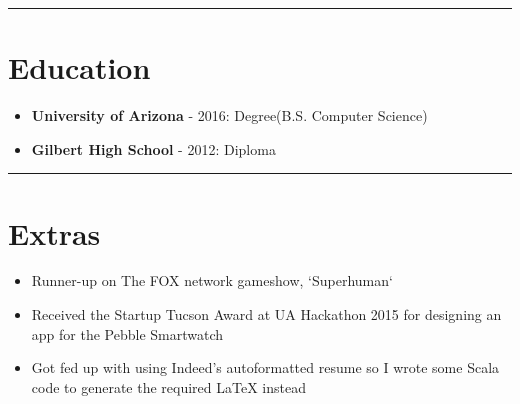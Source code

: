 \documentclass{article}
\begin{document}
\noindent\rule{\linewidth}{1pt}

\section*{Education}

\begin{itemize}\item \textbf{University of Arizona} - 2016: Degree(B.S. Computer Science)
\item \textbf{Gilbert High School} - 2012: Diploma\end{itemize}

\noindent\rule{\linewidth}{1pt}

\section*{Extras}

\begin{itemize}\item Runner-up on The FOX network gameshow, `Superhuman`
\item Received the Startup Tucson Award at UA Hackathon 2015 for designing an app for the Pebble Smartwatch
\item Got fed up with using Indeed's autoformatted resume so I wrote some Scala code to generate the required LaTeX instead\end{itemize}

\vspace*{\fill}

\end{document}
